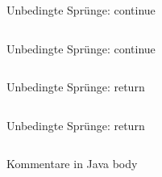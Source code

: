 \documentclass[18pt]{beamer}
\begin{document}
\begin{frame}[fragile]{Unbedingte Sprünge: continue}
    \begin{block}{}

    \end{block}
    \pause

    \begin{block}{}
        \begin{lstlisting}[language=Java]

        \end{lstlisting}
    \end{block}
\end{frame}

\begin{frame}[fragile]{Unbedingte Sprünge: continue}
    \begin{exampleblock}{}
    \begin{lstlisting}[language=Java]

    \end{lstlisting}
    \end{exampleblock}
\end{frame}

\begin{frame}[fragile]{Unbedingte Sprünge: return}
    \begin{block}{}

    \end{block}
    \pause

    \begin{block}{}
        \begin{lstlisting}[language=Java]

        \end{lstlisting}
    \end{block}
\end{frame}

\begin{frame}[fragile]{Unbedingte Sprünge: return}
    \begin{exampleblock}{}
    \begin{lstlisting}[language=Java]

    \end{lstlisting}
    \end{exampleblock}
\end{frame}

\appendix

\beginbackup

\begin{frame}{Kommentare in Java}
    body
\end{frame}
\end{document}
